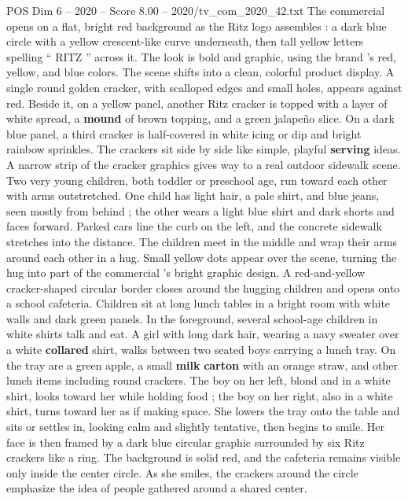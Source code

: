 \begin{textsample}{POS Dim 6 – 2020 – Score 8.00 – 2020/tv\_com\_2020\_42.txt}  \label{ex:f6_pos_065}
The commercial opens on a flat, bright red background as the Ritz logo assembles : a dark blue circle with a yellow crescent-like curve underneath, then tall yellow letters spelling “ RITZ ” across it.
The look is bold and graphic, using the brand ’s red, yellow, and blue colors.
The scene shifts into a clean, colorful product display.
A single round golden cracker, with scalloped edges and small holes, appears against red.
Beside it, on a yellow panel, another Ritz cracker is topped with a layer of white spread, a \textbf{mound} of brown topping, and a green jalapeño slice.
On a dark blue panel, a third cracker is half-covered in white icing or dip and bright rainbow sprinkles.
The crackers sit side by side like simple, playful \textbf{serving} ideas.
A narrow strip of the cracker graphics gives way to a real outdoor sidewalk scene.
Two very young children, both toddler or preschool age, run toward each other with arms outstretched.
One child has light hair, a pale shirt, and blue jeans, seen mostly from behind ; the other wears a light blue shirt and dark shorts and faces forward.
Parked cars line the curb on the left, and the concrete sidewalk stretches into the distance.
The children meet in the middle and wrap their arms around each other in a hug.
Small yellow dots appear over the scene, turning the hug into part of the commercial ’s bright graphic design.
A red-and-yellow cracker-shaped circular border closes around the hugging children and opens onto a school cafeteria.
Children sit at long lunch tables in a bright room with white walls and dark green panels.
In the foreground, several school-age children in white shirts talk and eat.
A girl with long dark hair, wearing a navy sweater over a white \textbf{collared} shirt, walks between two seated boys carrying a lunch tray.
On the tray are a green apple, a small \textbf{milk} \textbf{carton} with an orange straw, and other lunch items including round crackers.
The boy on her left, blond and in a white shirt, looks toward her while holding food ; the boy on her right, also in a white shirt, turns toward her as if making space.
She lowers the tray onto the table and sits or settles in, looking calm and slightly tentative, then begins to smile.
Her face is then framed by a dark blue circular graphic surrounded by six Ritz crackers like a ring.
The background is solid red, and the cafeteria remains visible only inside the center circle.
As she smiles, the crackers around the circle emphasize the idea of people gathered around a shared center.

\end{textsample}
